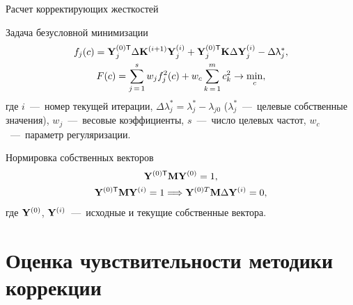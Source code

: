 \begin{frame}{Расчет корректирующих жесткостей}
	\begin{block}{Задача безусловной минимизации}
		\vspace{-1em}
		\begin{gather}
			f_j(c) = \mathbf{Y}_j^{(0)\mathsf{T}} \Delta \mathbf{K}^{(i+1)} \mathbf{Y}_j^{(i)} + \mathbf{Y}_j^{(0)\mathsf{T}} \mathbf{K} \Delta \mathbf{Y}_j^{(i)} - \Delta \uplambda^*_j, \\
			F(c) = \sum \limits_{j\,=\,1}^s w_j f_j^2(c) + w_c \sum \limits_{k\,=\,1}^m c_k^2 \rightarrow \min_{c},
		\end{gather}
		где $ i $~---~номер текущей итерации, $ \Delta \lambda^*_j = \lambda_j^* - \lambda_{j0} $ ($\lambda_j^*$~---~целевые собственные значения), $ w_j $~---~весовые коэффициенты, $ s $~---~число целевых частот, $ w_c $~---~параметр регуляризации.
	\end{block}	
	\begin{block}{Нормировка собственных векторов}
		\vspace{-1em}
		\begin{gather}
			\mathbf{Y}^{(0)\mathsf{T}} \mathbf{M} \mathbf{Y}^{(0)} = 1, \\
			\mathbf{Y}^{(0)\mathsf{T}} \mathbf{M} \mathbf{Y}^{(i)} = 1 \Longrightarrow \mathbf{Y}^{(0)T} \mathbf{M} \Delta \mathbf{Y}^{(i)} = 0,
		\end{gather}
		где $ \mathbf{Y}^{(0)} $, $ \mathbf{Y}^{(i)} $~---~исходные и текущие собственные вектора.
	\end{block}	
\end{frame}

\section{Оценка чувствительности методики коррекции}

